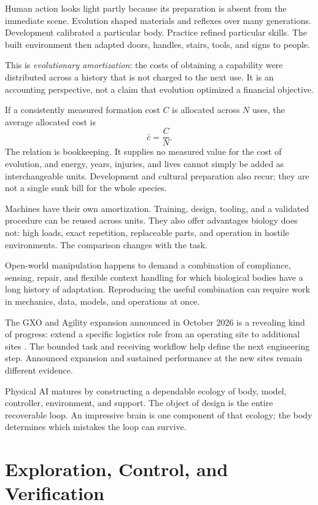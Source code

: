 \documentclass[11pt,openany]{book}
\begin{document}
Human action looks light partly because its preparation is absent from the immediate scene. Evolution shaped materials and reflexes over many generations. Development calibrated a particular body. Practice refined particular skills. The built environment then adapted doors, handles, stairs, tools, and signs to people.

This is \emph{evolutionary amortization}: the costs of obtaining a capability were distributed across a history that is not charged to the next use. It is an accounting perspective, not a claim that evolution optimized a financial objective.

If a consistently measured formation cost $C$ is allocated across $N$ uses, the average allocated cost is
\begin{equation}
 \bar c=\frac{C}{N}.
\end{equation}
The relation is bookkeeping. It supplies no measured value for the cost of evolution, and energy, years, injuries, and lives cannot simply be added as interchangeable units. Development and cultural preparation also recur; they are not a single sunk bill for the whole species.

Machines have their own amortization. Training, design, tooling, and a validated procedure can be reused across units. They also offer advantages biology does not: high loads, exact repetition, replaceable parts, and operation in hostile environments. The comparison changes with the task.

Open-world manipulation happens to demand a combination of compliance, sensing, repair, and flexible context handling for which biological bodies have a long history of adaptation. Reproducing the useful combination can require work in mechanics, data, models, and operations at once.

The GXO and Agility expansion announced in October 2026 is a revealing kind of progress: extend a specific logistics role from an operating site to additional sites \cite{gxo2026digit}. The bounded task and receiving workflow help define the next engineering step. Announced expansion and sustained performance at the new sites remain different evidence.

Physical AI matures by constructing a dependable ecology of body, model, controller, environment, and support. The object of design is the entire recoverable loop. An impressive brain is one component of that ecology; the body determines which mistakes the loop can survive.

\section{Exploration, Control, and Verification}
\end{document}
